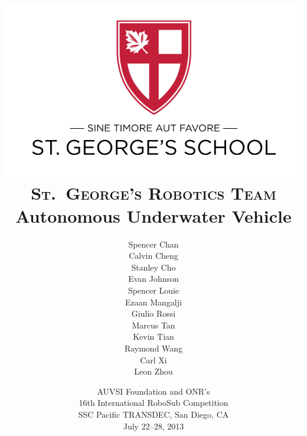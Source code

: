 \documentclass[12pt, letterpaper, twocolumn, titlepage]{article}
\begin{document}
\title{\vspace{-10pc}\includegraphics{Logo.png}\\\vspace{2pc}\textsc{St.\ George's Robotics Team}\\
\LARGE{Autonomous Underwater Vehicle}}
\author{Spencer Chan\\Calvin Cheng\\Stanley Cho\\Evan Johnson\\Spencer Louie\\Ezaan Mangalji\\Giulio Rossi\\Marcus Tan\\Kevin Tian\\Raymond Wang\\Carl Xi\\Leon Zhou}
\date{AUVSI Foundation and ONR's\\16th International RoboSub Competition\\SSC Pacific TRANSDEC, San Diego, CA\\July 22--28, 2013}
\maketitle

\setlength{\columnsep}{1.4pc}
\end{document}
